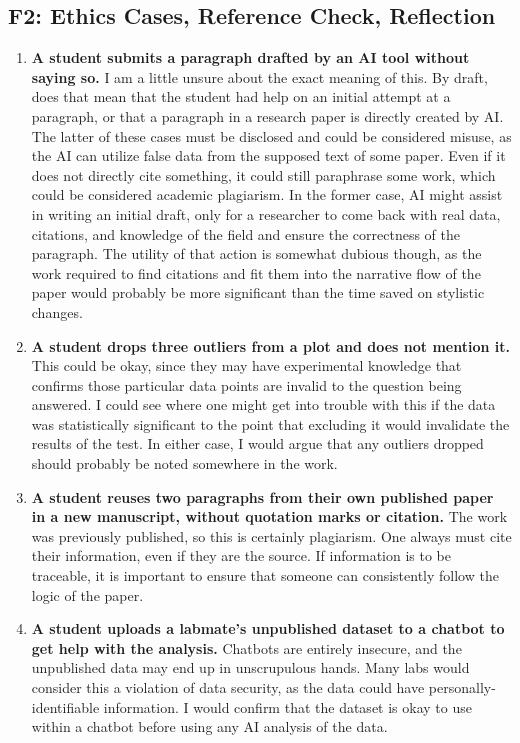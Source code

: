 \subsection{F2: Ethics Cases, Reference Check, Reflection}
\begin{enumerate}
    \item \textbf{A student submits a paragraph drafted by an AI tool without saying so.} I am a little unsure about the exact meaning of this. By draft, does that mean that the student had help on an initial attempt at a paragraph, or that a paragraph in a research paper is directly created by AI. The latter of these cases must be disclosed and could be considered misuse, as the AI can utilize false data from the supposed text of some paper. Even if it does not directly cite something, it could still paraphrase some work, which could be considered academic plagiarism. In the former case, AI might assist in writing an initial draft, only for a researcher to come back with real data, citations, and knowledge of the field and ensure the correctness of the paragraph. The utility of that action is somewhat dubious though, as the work required to find citations and fit them into the narrative flow of the paper would probably be more significant than the time saved on stylistic changes.
    \item \textbf{A student drops three outliers from a plot and does not mention it.} This could be okay, since they may have experimental knowledge that confirms those particular data points are invalid to the question being answered. I could see where one might get into trouble with this if the data was statistically significant to the point that excluding it would invalidate the results of the test. In either case, I would argue that any outliers dropped should probably be noted somewhere in the work.
    \item \textbf{A student reuses two paragraphs from their own published paper in a new manuscript, without quotation marks or citation.} The work was previously published, so this is certainly plagiarism. One always must cite their information, even if they are the source. If information is to be traceable, it is important to ensure that someone can consistently follow the logic of the paper.
    \item \textbf{A student uploads a labmate's unpublished dataset to a chatbot to get help with the analysis.} Chatbots are entirely insecure, and the unpublished data may end up in unscrupulous hands. Many labs would consider this a violation of data security, as the data could have personally-identifiable information. I would confirm that the dataset is okay to use within a chatbot before using any AI analysis of the data.
\end{enumerate}


